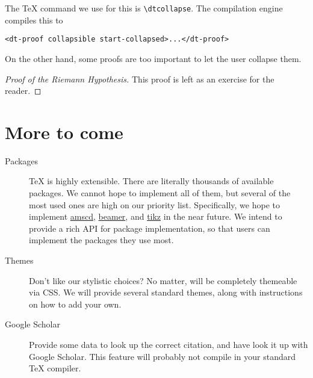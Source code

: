 \documentclass[11pt]{article}
\begin{document}
The \TeX{} command we use for this is \verb|\dtcollapse|.
The compilation engine compiles this to
\begin{verbatim}
<dt-proof collapsible start-collapsed>...</dt-proof>
\end{verbatim}

On the other hand, some proofs are too important to let the user collapse them.
\begin{proof}[Proof of the Riemann Hypothesis]\dtnocollapse
    This proof is left as an exercise for the reader.
\end{proof}

\section{More to come}
\begin{description}
    \item[Packages]
        \TeX{} is highly extensible.
        There are literally thousands of available packages.
        We cannot hope to implement all of them, but several of the most used ones are high on our priority list.
        Specifically, we hope to implement \href{https://www.ctan.org/pkg/amscd}{amscd}, \href{https://www.ctan.org/pkg/beamer}{beamer}, and \href{http://www.texample.net/tikz/}{tikz} in the near future.
        We intend to provide a rich API for package implementation, so that users can implement the packages they use most.

    \item[Themes]
        Don't like our stylistic choices?
        No matter, \DiscoTeX{} will be completely themeable via CSS.
        We will provide several standard themes, along with instructions on how to add your own.

    \item[Google Scholar] Provide some data to look up the correct citation, and have \DiscoTeX{} look it up with Google Scholar. This feature will probably not compile in your standard \TeX{} compiler.
\end{description}

\begin{thebibliography}{widest-label}
\end{thebibliography}
\end{document}
